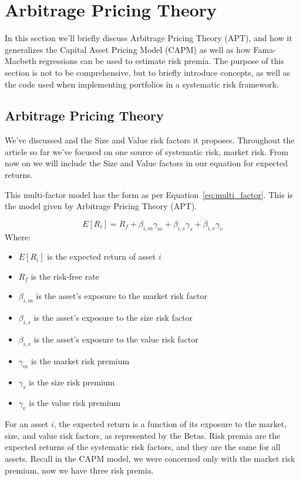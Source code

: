 \section{Arbitrage Pricing Theory}
\label{sec:arbitrage_pricing_theory}
In this section we'll briefly discuss Arbitrage Pricing Theory (APT), and how it generalizes the Capital Asset Pricing Model (CAPM) as well as 
how Fama-Macbeth regressions can be used to estimate risk premia. The purpose of this section is not to be comprehensive,
but to briefly introduce concepts, as well as the code used when implementing portfolios in a systematic risk framework.

\subsection{Arbitrage Pricing Theory}
We've discussed \citet{fama_french_1993} and the Size and Value risk factors it proposes.
Throughout the article so far we've focused on one source of systematic risk, market risk.
From now on we will include the Size and Value factors in our equation for expected returns.

This multi-factor model has the form as per Equation~{\ref{eq:multi_factor}}. This is the model given by Arbitrage Pricing Theory (APT).

\begin{equation}
    \label{eq:multi_factor}
    E[R_i] = R_f + \beta_{i,m} \gamma_m + \beta_{i,s} \gamma_s + \beta_{i,v} \gamma_v
\end{equation}
Where:
\begin{itemize}
    \item $E[R_i]$ is the expected return of asset $i$
    \item $R_f$ is the risk-free rate
    \item $\beta_{i,m}$ is the asset's exposure to the market risk factor
    \item $\beta_{i,s}$ is the asset's exposure to the size risk factor
    \item $\beta_{i,v}$ is the asset's exposure to the value risk factor
    \item $\gamma_m$ is the market risk premium
    \item $\gamma_s$ is the size risk premium
    \item $\gamma_v$ is the value risk premium
\end{itemize}

For an asset $i$, the expected return is a function of its exposure to the market, size, and value risk factors, as represented by the Betas.
Risk premia are the expected returns of the systematic risk factors, and they are the same for all assets. Recall in the CAPM model, we were concerned only with
the market risk premium, now we have three risk premia.

